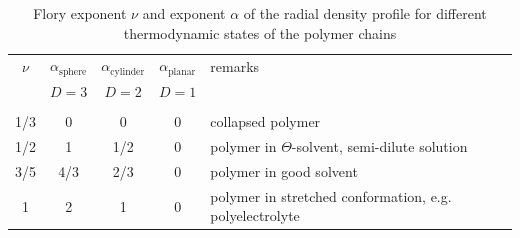 \begin{table}[htb]
\caption{Flory exponent $\nu$ and exponent $\alpha$ of the radial
density profile for different thermodynamic states of
the polymer chains}
\label{FloryExp}
\begin{tabular}{ccccl}
  \hline
  $\nu$ & $\alpha_\text{sphere}$& $\alpha_\text{cylinder}$ & $\alpha_\text{planar}$& \hspace{5mm}remarks \\
        & $D=3$                 & $D=2$                    & $D=1$                 & \\
  \hline
  & & & & \\
  1/3 & 0   & 0   & 0 & collapsed polymer \\
  1/2 & 1   & 1/2 & 0 & polymer in $\Theta$-solvent, semi-dilute solution \\
  3/5 & 4/3 & 2/3 & 0 & polymer in good solvent \\
  1   & 2   & 1   & 0 & polymer in stretched conformation,  e.g. polyelectrolyte
\end{tabular}
\end{table}

